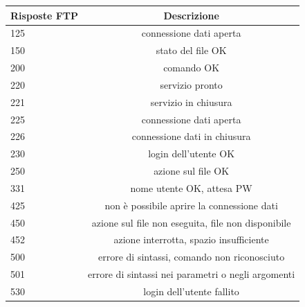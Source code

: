 \documentclass[11pt,a4paper,oneside]{book}
\theoremstyle{definition}
\begin{document}
\begin{table}[h!]
	\begin{center}
		\label{tab:table1}
		\begin{tabular}{l|c}
			\textbf{Risposte FTP} & \textbf{Descrizione}                               \\
			\hline
			125                   & connessione dati aperta                            \\
			150                   & stato del file OK                                  \\
			200                   & comando OK
			\\
			220                   & servizio pronto                                    \\
			221                   & servizio in chiusura                               \\
			225                   & connessione dati aperta                            \\
			226                   & connessione dati in chiusura                       \\
			230                   & login dell'utente OK                               \\
			250                   & azione sul file OK                                 \\
			331                   & nome utente OK, attesa PW                          \\
			425                   & non è possibile aprire la connessione dati         \\
			450                   & azione sul file non eseguita, file non disponibile \\
			452                   & azione interrotta, spazio insufficiente            \\
			500                   & errore di sintassi, comando non riconosciuto       \\
			501                   & errore di sintassi nei parametri o negli argomenti \\
			530                   & login dell'utente fallito                          \\
		\end{tabular}
	\end{center}
\end{table}

\pagebreak
\end{document}
